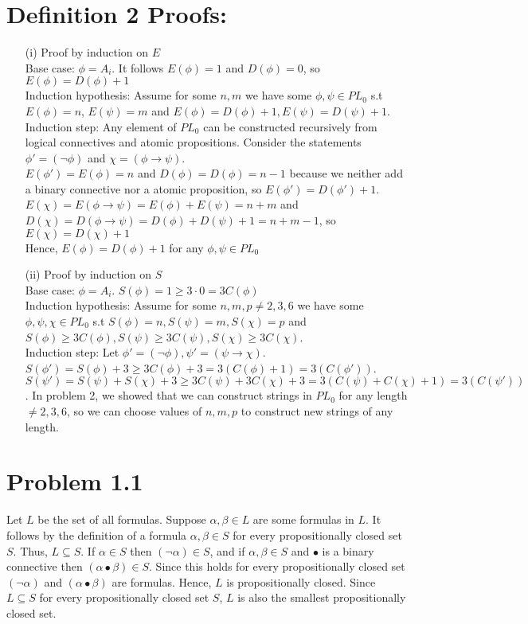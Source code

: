 \documentclass[10pt]{article}
\begin{document}
\section*{Definition 2 Proofs:}
\begin{itemize}
    \item [(i)] Proof by induction on $E$\\
    Base case: $\phi=A_i$. It follows $E(\phi)=1$ and $D(\phi)=0$, so $E(\phi)=D(\phi)+1$\\
    Induction hypothesis: Assume for some $n,m$ we have some $\phi,\psi\in PL_0$ s.t $E(\phi)=n$, $E(\psi)=m$ and $E(\phi)=D(\phi)+1,E(\psi)=D(\psi)+1$.\\
    Induction step: Any element of $PL_0$ can be constructed recursively from logical connectives and atomic propositions.
    Consider the statements $\phi'=(\lnot\phi)$ and $\chi=(\phi\rightarrow\psi)$.\\
    $E(\phi')=E(\phi)=n$ and $D(\phi)=D(\phi)=n-1$ because we neither add a binary connective nor a atomic proposition, so $E(\phi')=D(\phi')+1$.\\
    $E(\chi)=E(\phi\rightarrow\psi)=E(\phi)+E(\psi)=n+m$ and $D(\chi)=D(\phi\rightarrow\psi)=D(\phi)+D(\psi)+1=n+m-1$, so $E(\chi)=D(\chi)+1$\\
    Hence, $E(\phi)=D(\phi)+1$ for any $\phi,\psi\in PL_0$
    \item [(ii)] Proof by induction on $S$\\
    Base case: $\phi=A_i$. $S(\phi)=1\ge 3\cdot0=3C(\phi)$\\
    Induction hypothesis: Assume for some $n,m,p\neq 2,3,6$ we have some $\phi,\psi,\chi\in PL_0$ s.t $S(\phi)=n,S(\psi)=m,S(\chi)=p$ and $S(\phi)\ge 3C(\phi),S(\psi)\ge 3C(\psi),S(\chi)\ge 3C(\chi)$.\\
    Induction step: Let $\phi'=(\lnot \phi),\psi'=(\psi\rightarrow \chi)$.\\ 
    $S(\phi')=S(\phi)+3\ge 3C(\phi)+3=3(C(\phi)+1)=3(C(\phi'))$.\\ 
    $S(\psi')=S(\psi)+S(\chi)+3\ge 3C(\psi)+3C(\chi)+3=3(C(\psi)+C(\chi)+1)=3(C(\psi'))$.
    In problem 2, we showed that we can construct strings in $PL_0$ for any length $\neq 2,3,6$, so we can choose values of $n,m,p$ to construct new strings of any length.
\end{itemize}
\section*{Problem 1.1}
Let $L$ be the set of all formulas. 
Suppose $\alpha,\beta\in L$ are some formulas in $L$.
It follows by the definition of a formula $\alpha,\beta\in S$ for every propositionally closed set $S$.
Thus, $L\subseteq S$.
If $\alpha\in S$ then $(\lnot \alpha)\in S$, and if $\alpha,\beta\in S$ and $\bullet$ is a binary connective then $(\alpha\bullet\beta)\in S$.
Since this holds for every propositionally closed set $(\lnot \alpha)$ and $(\alpha\bullet\beta)$ are formulas. 
Hence, $L$ is propositionally closed. 
Since $L\subseteq S$ for every propositionally closed set $S$, $L$ is also the smallest propositionally closed set.
\end{document}
